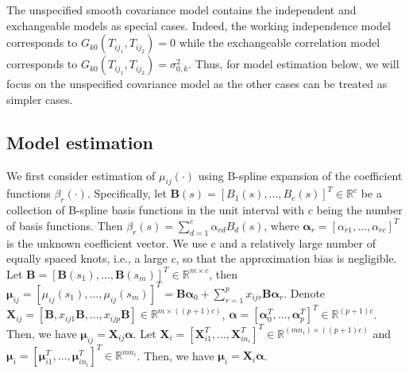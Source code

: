 \documentclass[submit]{smj}
\def\bB{\mathbf{B}}
\def\balpha{\boldsymbol{\alpha}}
\def\bmu{\boldsymbol{\mu}}
\def\bX{\mathbf{X}}
\def\bX{\mathbf{X}}
\def\bB{\mathbf{B}}
\def\balpha{\boldsymbol{\alpha}}
\def\bX{\mathbf{X}}
\begin{document}
The unspecified smooth covariance model contains the independent and exchangeable models as special cases. Indeed, the working independence model corresponds to $G_{k0}(T_{ij_1},T_{ij_2}) = 0$ while the exchangeable correlation model corresponds to  $G_{k0}(T_{ij_1},T_{ij_2}) = \sigma_{0, k}^2$. Thus, for model estimation below, we will focus on the unspecified covariance model as the other cases can be treated as simpler cases.

\subsection{Model estimation} \label{sec:Modelestimation}
We first consider estimation of $\mu_{ij}(\cdot)$ using B-spline expansion of the coefficient functions $\beta_r(\cdot)$. Specifically, let $\bB(s) = [B_1(s),\ldots, B_c(s)]^{T}\in \mathbb{R}^c$ be a collection of B-spline basis functions in the unit interval with $c$ being the number of basis functions. Then $\beta_r(s) = \sum_{d=1}^c \alpha_{rd} B_{d}(s)$, where $\balpha_r = [\alpha_{r1},\ldots, \alpha_{rc}]^{T}$ is the unknown coefficient vector. 
We use c and a relatively large number of equally spaced knots, i.e., a large $c$, so that the approximation bias is negligible. Let $\bB =[\bB(s_1),\ldots, \bB(s_m)]^T\in \mathbb{R}^{m\times c}$, then
$\bmu_{ij} = [\mu_{ij}(s_1),\ldots, \mu_{ij}(s_m)]^T = \bB\balpha_0 + \sum_{r=1}^p x_{ijr}\bB\balpha_r$. Denote
$\bX_{ij} = [\bB, x_{ij1}\bB,\ldots, x_{ijp}\bB]\in \mathbb{R}^{m\times ((p+1)c)}$, 
$\balpha= [\balpha^T_0,\ldots,\balpha^T_p]^T\in\mathbb{R}^{(p+1)c}$. Then, we have
$\bmu_{ij} = \bX_{ij}\balpha$.
Let $\bX_i = [\bX^T_{i1},\ldots,\bX^T_{in_i}]^T\in \mathbb{R}^{(mn_i)\times ((p+1)c)}$
and $\bmu_i = [\bmu^T_{i1},\ldots, \bmu^T_{in_i}]^T\in \mathbb{R}^{mn_i}$. Then, we have $\bmu_i = \bX_i \balpha$. 
\end{document}

